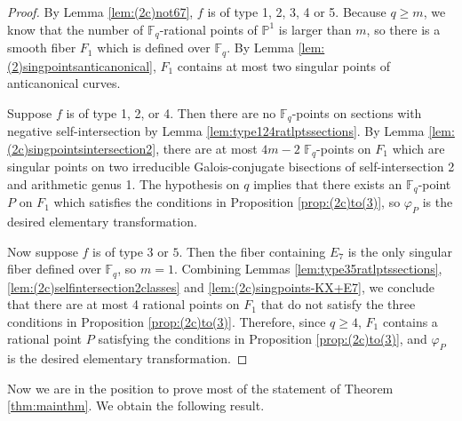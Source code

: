 \documentclass[a4paper, 11pt, reqno]{amsart}
\numberwithin{equation}{section} \numberwithin{figure}{section}
\def \F {{\mathbb F}}
\def \P {{\mathbb P}}
\theoremstyle{definition}
\numberwithin{lemma}{section}
\begin{document}
\begin{proof}
    By Lemma \ref{lem:(2c)not67}, $f$ is of type 1, 2, 3, 4 or 5. Because $q \geq m$, we know that the number of $\F_q$-rational points of $\P^1$ is larger than $m$, so there is a smooth fiber $F_1$ which is defined over $\F_q$. By Lemma \ref{lem:(2)singpointsanticanonical}, $F_1$ contains at most two singular points of anticanonical curves. 
    
    Suppose $f$ is of type 1, 2, or 4. Then there are no $\F_q$-points on sections with negative self-intersection by Lemma \ref{lem:type124ratlptssections}. By Lemma \ref{lem:(2c)singpointsintersection2}, there are at most $4m-2$ $\F_q$-points on $F_1$ which are singular points on two irreducible Galois-conjugate bisections of self-intersection 2 and arithmetic genus 1. The hypothesis on $q$ implies that there exists an $\F_q$-point $P$ on $F_1$ which satisfies the conditions in Proposition \ref{prop:(2c)to(3)}, so $\varphi_{\scriptscriptstyle P}$ is the desired elementary transformation.

    Now suppose $f$ is of type $3$ or $5$. Then the fiber containing $E_7$ is the only singular fiber defined over $\F_q$, so $m = 1$. Combining Lemmas \ref{lem:type35ratlptssections}, \ref{lem:(2c)selfintersection2classes} and \ref{lem:(2c)singpoints-KX+E7}, we conclude that there are at most 4 rational points on $F_1$ that do not satisfy the three conditions in Proposition \ref{prop:(2c)to(3)}. Therefore, since $q \geq 4$, $F_1$ contains a rational point $P$ satisfying the conditions in Proposition \ref{prop:(2c)to(3)}, and $\varphi_{\scriptscriptstyle P}$ is the desired elementary transformation.
\end{proof}

Now we are in the position to prove most of the statement of Theorem \ref{thm:mainthm}. We obtain the following result.
\end{document}
